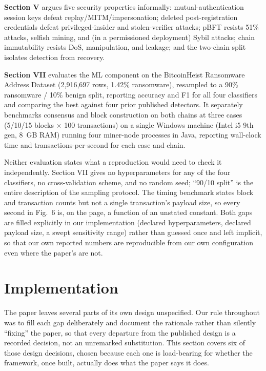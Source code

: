 \documentclass[conference]{IEEEtran}
\begin{document}
\textbf{Section V} argues five security properties informally: mutual-authentication session
keys defeat replay/MITM/impersonation; deleted post-registration credentials defeat
privileged-insider and stolen-verifier attacks; pBFT resists 51\% attacks, selfish mining, and
(in a permissioned deployment) Sybil attacks; chain immutability resists DoS, manipulation, and
leakage; and the two-chain split isolates detection from recovery.

\textbf{Section VII} evaluates the ML component on the BitcoinHeist Ransomware Address Dataset
\cite{akcora2021bitcoinheist} (2{,}916{,}697 rows, 1.42\% ransomware), resampled to a 90\%
ransomware / 10\% benign split, reporting accuracy and F1 for all four classifiers and comparing
the best against four prior published detectors. It separately benchmarks consensus and block
construction on both chains at three cases (5/10/15 blocks $\times$ 100 transactions) on a
single Windows machine (Intel i5 9th gen, 8~GB RAM) running four miner-node processes in Java,
reporting wall-clock time and transactions-per-second for each case and chain.

Neither evaluation states what a reproduction would need to check it independently. Section VII
gives no hyperparameters for any of the four classifiers, no cross-validation scheme, and no
random seed; ``90/10 split'' is the entire description of the sampling protocol. The timing
benchmark states block and transaction counts but not a single transaction's payload size, so
every second in Fig.~6 is, on the page, a function of an unstated constant. Both gaps are
filled explicitly in our implementation (declared hyperparameters, declared payload size, a
swept sensitivity range) rather than guessed once and left implicit, so that our own reported
numbers are reproducible from our own configuration even where the paper's are not.
\section{Implementation}
\label{sec:impl}

The paper leaves several parts of its own design unspecified. Our rule throughout was to fill
each gap deliberately and document the rationale rather than silently ``fixing'' the paper, so
that every departure from the published design is a recorded decision, not an unremarked
substitution. This section covers six of those design decisions, chosen because each one is
load-bearing for whether the framework, once built, actually does what the paper says it does.
\end{document}
